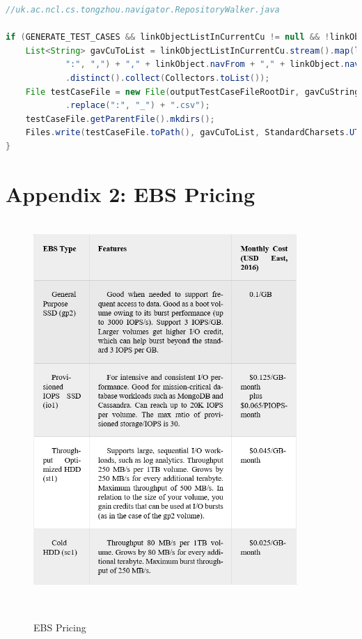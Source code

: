 \documentclass[runningheads]{llncs}
\begin{document}
\begin{lstlisting}[language=Java, caption=Generating test cases for automation test ]
//uk.ac.ncl.cs.tongzhou.navigator.RepositoryWalker.java

if (GENERATE_TEST_CASES && linkObjectListInCurrentCu != null && !linkObjectListInCurrentCu.isEmpty()) {
	List<String> gavCuToList = linkObjectListInCurrentCu.stream().map(linkObject -> gavCuString.replace(
			":", ",") + "," + linkObject.navFrom + "," + linkObject.navTo)
			.distinct().collect(Collectors.toList());
	File testCaseFile = new File(outputTestCaseFileRootDir, gavCuString
			.replace(":", "_") + ".csv");
	testCaseFile.getParentFile().mkdirs();
	Files.write(testCaseFile.toPath(), gavCuToList, StandardCharsets.UTF_8);
}
\end{lstlisting}

\newpage
\section{Appendix 2: EBS Pricing}

\begin{figure}[H]
    \centering
    \includegraphics[width=10cm]{pic/ebs-pricing.png}
    \caption{EBS Pricing\cite{aws-ebs-pricing}}
    \label{EBS Pricing}
\end{figure}
\end{document}
